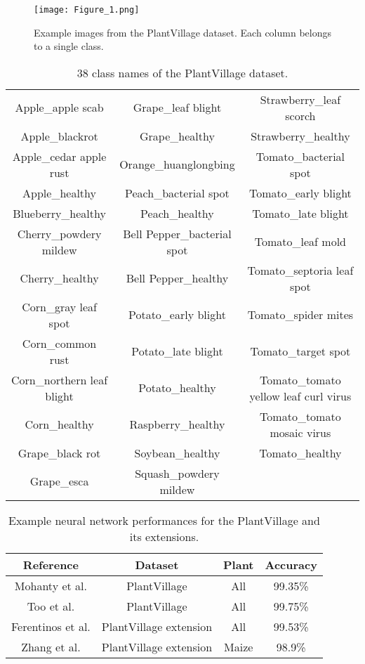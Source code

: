 \documentclass{article}
\begin{document}
\begin{figure}
\centering
\texttt{[image: Figure\_1.png]}
\caption{\label{fig:PlantVillage}Example images from the PlantVillage dataset. Each column belongs to a single class.}
\end{figure}

\begin{table}[h]
\centering
\begin{tabular}{c|c|c}
Apple\_apple scab & Grape\_leaf blight & Strawberry\_leaf scorch\\
Apple\_blackrot & Grape\_healthy & Strawberry\_healthy\\
Apple\_cedar apple rust	& Orange\_huanglongbing	& Tomato\_bacterial spot\\
Apple\_healthy	& Peach\_bacterial spot	& Tomato\_early blight\\
Blueberry\_healthy	& Peach\_healthy	& Tomato\_late blight\\
Cherry\_powdery mildew	& Bell Pepper\_bacterial spot	& Tomato\_leaf mold\\
Cherry\_healthy	& Bell Pepper\_healthy	& Tomato\_septoria leaf spot\\
Corn\_gray leaf spot	& Potato\_early blight	& Tomato\_spider mites\\
Corn\_common rust	& Potato\_late blight	& Tomato\_target spot\\
Corn\_northern leaf blight	& Potato\_healthy	& Tomato\_tomato yellow leaf curl virus\\
 Corn\_healthy	& Raspberry\_healthy	& Tomato\_tomato mosaic virus\\
Grape\_black rot	& Soybean\_healthy	& Tomato\_healthy\\
Grape\_esca	& Squash\_powdery mildew\\
\end{tabular}
\caption{38 class names of the PlantVillage dataset.}
\label{table:2}
\end{table}

\begin{table}[h]
\centering
\begin{tabular}{c|c|c|c}
Reference & Dataset & Plant & Accuracy\\\hline
Mohanty et al.\cite{Mohanty2016}& PlantVillage & All & 99.35\%\\
Too et al.\cite{Too2019}& PlantVillage & All & 99.75\%\\
Ferentinos et al.\cite{Ferentinos2018} & PlantVillage extension & All & 99.53\%\\
Zhang et al.\cite{Zhang2018} & PlantVillage extension & Maize & 98.9\%\\
\end{tabular}
\caption{Example neural network performances for the PlantVillage and its extensions.}
\label{table:3}
\end{table}
\end{document}
